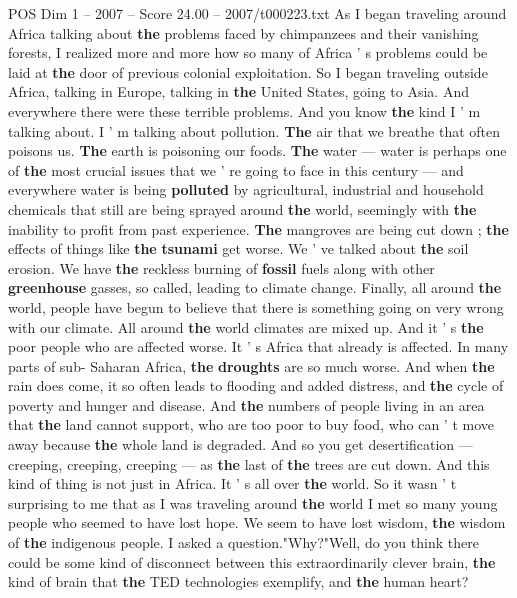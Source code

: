 \begin{textsample}{POS Dim 1 – 2007 – Score 24.00 – 2007/t000223.txt}
As I began traveling around Africa talking about \textbf{the} problems faced by chimpanzees and their vanishing forests, I realized more and more how so many of Africa ' s problems could be laid at \textbf{the} door of previous colonial exploitation.
So I began traveling outside Africa, talking in Europe, talking in \textbf{the} United States, going to Asia.
And everywhere there were these terrible problems.
And you know \textbf{the} kind I ' m talking about.
I ' m talking about pollution. \textbf{The} air that we breathe that often poisons us. \textbf{The} earth is poisoning our foods. \textbf{The} water — water is perhaps one of \textbf{the} most crucial issues that we ' re going to face in this century — and everywhere water is being \textbf{polluted} by agricultural, industrial and household chemicals that still are being sprayed around \textbf{the} world, seemingly with \textbf{the} inability to profit from past experience. \textbf{The} mangroves are being cut down ; \textbf{the} effects of things like \textbf{the} \textbf{tsunami} get worse.
We ' ve talked about \textbf{the} soil erosion.
We have \textbf{the} reckless burning of \textbf{fossil} fuels along with other \textbf{greenhouse} gasses, so called, leading to climate change.
Finally, all around \textbf{the} world, people have begun to believe that there is something going on very wrong with our climate.
All around \textbf{the} world climates are mixed up.
And it ' s \textbf{the} poor people who are affected worse.
It ' s Africa that already is affected.
In many parts of sub- Saharan Africa, \textbf{the} \textbf{droughts} are so much worse.
And when \textbf{the} rain does come, it so often leads to flooding and added distress, and \textbf{the} cycle of poverty and hunger and disease.
And \textbf{the} numbers of people living in an area that \textbf{the} land cannot support, who are too poor to buy food, who can ' t move away because \textbf{the} whole land is degraded.
And so you get desertification — creeping, creeping, creeping — as \textbf{the} last of \textbf{the} trees are cut down.
And this kind of thing is not just in Africa.
It ' s all over \textbf{the} world.
So it wasn ' t surprising to me that as I was traveling around \textbf{the} world I met so many young people who seemed to have lost hope.
We seem to have lost wisdom, \textbf{the} wisdom of \textbf{the} indigenous people.
I asked a question."Why?"Well, do you think there could be some kind of disconnect between this extraordinarily clever brain, \textbf{the} kind of brain that \textbf{the} TED technologies exemplify, and \textbf{the} human heart?

\end{textsample}
